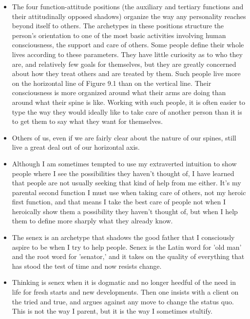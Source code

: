 \begin{itemize}
\item The four function-attitude positions (the auxiliary and tertiary
functions and their attitudinally opposed shadows) organize the way any
personality reaches beyond itself to others. The archetypes in these positions
structure the person's orientation to one of the most basic activities
involving human consciousness, the support and care of others. Some people
define their whole lives according to these parameters. They have little
curiosity as to who they are, and relatively few goals for themselves, but they
are greatly concerned about how they treat others and are treated by them. Such
people live more on the horizontal line of Figure 9.1 than on the vertical
line. Their consciousness is more organized around what their arms are doing
than around what their spine is like. Working with such people, it is often
easier to type the way they would ideally like to take care of another person
than it is to get them to say what they want for themselves.

\item Others of us, even if we are fairly clear about the nature of our spines,
still live a great deal out of our horizontal axis.

\item Although I am sometimes tempted to use my extraverted intuition to show
people where I see the possibilities they haven't thought of, I have learned
that people are not usually seeking that kind of help from me either. It's my
parental second function I must use when taking care of others, not my heroic
first function, and that means I take the best care of people not when I
heroically show them a possibility they haven't thought of, but when I help
them to define more sharply what they already know.

\item The senex is an archetype that shadows the good father that I
consciously aspire to be when I try to help people. Senex is the Latin word for
'old man' and the root word for 'senator,' and it takes on the quality of
everything that has stood the test of time and now resists change.

\item Thinking is senex when it is dogmatic and no longer heedful of the need
in life for fresh starts and new developments. Then one insists with a client
on the tried and true, and argues against any move to change the status quo.
This is not the way I parent, but it is the way I sometimes stultify.


\end{itemize}
